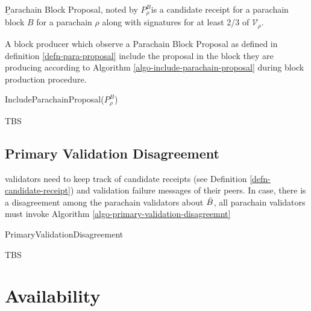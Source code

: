 \begin{definition}
  \label{defn-para-proposal}
        {\b Parachain Block Proposal}, noted by $P^B_{\rho}$is a candidate receipt for a parachain block $B$ for a parachain $\rho$ along with signatures for at least 2/3 of $\mathcal{V}_\rho$.  %

\end{definition}

A block producer which observe a Parachain Block Proposal as defined in definition \ref{defn-para-proposal}  include the proposal in the block they are producing according to Algorithm \ref{algo-include-parachain-proposal} during block production procedure.

\begin{algorithm}
  \caption[]{\sc IncludeParachainProposal($P^B_{\rho}$)}
  \label{algo-include-parachain-proposal}
  \begin{algorithmic}[1]
    \Require{}

    \State TBS
  \end{algorithmic}
\end{algorithm}


\subsection{Primary Validation Disagreement}
\label{sect-primary-validation-disagreemnt}
 validators need to keep track of candidate receipts (see Definition \ref{defn-candidate-receipt}) and validation failure messages of their peers. In case, there is a disagreement among the parachain validators about $\bar{B}$, all parachain validators must invoke Algorithm \ref{algo-primary-validation-disagreemnt}

\begin{algorithm}
  \caption[]{\sc PrimaryValidationDisagreement}
  \label{algo-primary-validation-disagreemnt}
  \begin{algorithmic}[1]
    \Require{}

    \State TBS
  \end{algorithmic}
\end{algorithm}

\section{Availability}

